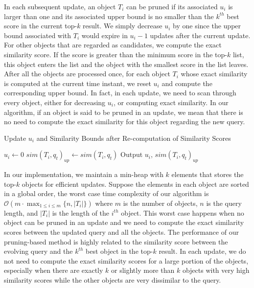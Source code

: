 In each subsequent update, an object $T_i$ can be pruned if its associated $u_i$ is larger than one and its associated upper bound is no smaller than the $k^{th}$ best score in the current top-$k$ result. We simply decrease $u_i$ by one since the upper bound associated with $T_i$ would expire in $u_i - 1$ updates after the current update. For other objects that are regarded as candidates, we compute the exact similarity score. If the score is greater than the minimum score in the top-$k$ list, this object enters the list and the object with the smallest score in the list leaves. After all the objects are processed once, for each object $T_i$ whose exact similarity is computed at the current time instant, we reset $u_i$ and compute the corresponding upper bound. In fact, in each update, we need to scan through every object, either for decreasing $u_i$, or computing exact similarity. In our algorithm, if an object is said to be pruned in an update, we mean that there is no need to compute the exact similarity for this object regarding the new query.   

\begin{algorithm2e}[t]
 \SetAlgoLined%
 \caption{Update $u_i$ and Similarity Bounds after Re-computation of Similarity Scores}
\label{GPsub}
 
  {$u_i \gets 0$\; $sim(T_i, q_t)_{up} \gets sim(T_i, q_t)$\;}
  Output $u_i$, $sim(T_i, q_t)_{up}$\;
 \end{algorithm2e}
 
 

In our implementation, we maintain a min-heap with $k$ elements that stores the top-$k$ objects for efficient updates. Suppose the elements in each object are sorted in a global order, the worst case time complexity of our algorithm is $\mathcal{O}(m\cdot \displaystyle\max_{1 \leq i \leq m}\{n, |T_i|\})$ where $m$ is the number of objects, $n$ is the query length, and $|T_i|$ is the length of the $i^{th}$ object. This worst case happens when no object can be pruned in an update and we need to compute the exact similarity scores between the updated query and all the objects. 
The performance of our pruning-based method is highly related to the similarity score between the evolving query and the $k^{th}$ best object in the top-$k$ result. In each update, we do not need to compute the exact similarity scores for a large portion of the objects, especially when there are exactly $k$ or slightly more than $k$ objects with very high similarity scores while the other objects are very dissimilar to the query. 

